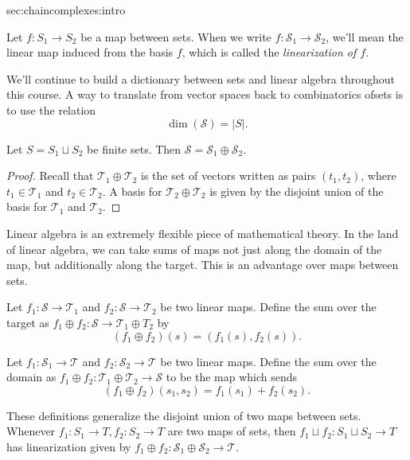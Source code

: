 \begin{stationconnection}{sec:chaincomplexes:intro}
\begin{definition}
Let $f:S_1\to S_2$ be a map between sets. When we  write  $f: \mathcal S_1\to \mathcal S_2$, we'll mean the linear map induced from the basis $f$, which is called the \emph{linearization of $f$}.
\end{definition}
We'll continue to build a dictionary between sets and linear algebra throughout this course. A way to translate from vector spaces back to combinatorics ofsets is to use the relation 
\[\dim(\mathcal S)=|S|.\]
\begin{claim}
Let $S= S_1\sqcup S_2$ be finite sets. Then $\mathcal S= \mathcal S_1\oplus \mathcal S_2. $
\end{claim}
\begin{proof}
Recall that $\mathcal T_1\oplus \mathcal T_2$ is the set of vectors written as pairs $(t_1, t_2)$, where $t_1\in \mathcal T_1$ and $t_2\in \mathcal T_2$. A basis for $\mathcal T_2\oplus \mathcal T_2$ is given by the disjoint union of the basis for $\mathcal T_1$ and $\mathcal T_2$. 
\end{proof}
Linear algebra is an extremely flexible piece of mathematical theory. In the land of linear algebra, we can take sums of maps not just along the domain of the map, but additionally along the target. This is an advantage over maps between sets.  
\begin{definition} Let $f_1: \mathcal S\to \mathcal T_1$ and $f_2: \mathcal S\to \mathcal T_2$ be two linear maps. Define the sum over the target as $f_1\oplus f_2: \mathcal S\to \mathcal T_1\oplus T_2$ by 
\[(f_1\oplus f_2)(s)=(f_1(s), f_2(s)).\]
\end{definition}
\begin{definition} Let $f_1: \mathcal S_1\to \mathcal T$ and $f_2: \mathcal S_2 \to \mathcal T$ be two linear maps. Define the sum over the domain as $f_1\oplus f_2: \mathcal T_1\oplus \mathcal T_2\to \mathcal S$ to be the map which sends 
\[ (f_1\oplus f_2)(s_1, s_2)=f_1(s_1)+f_2(s_2).\]
\end{definition}
These definitions generalize the disjoint union of two maps between sets. Whenever $f_1:S_1\to T, f_2: S_2\to T$ are two maps of sets, then $f_1\sqcup f_2: S_1\sqcup S_2\to T$ has linearization given by $f_1\oplus f_2: \mathcal S_1\oplus \mathcal S_2\to \mathcal T$. 
\begin{comment}
Suppose we have a decomposition of a set $C$ into subsets $S_1$ and $S_2$, which we might represent by the following commutative diagram. 
\[
\begin{tikzcd}
A= S_1\cap S_2\arrow{r}{i_1} \arrow{d}{i_2}& S_1 \arrow{d}{j_1}\\

\end{comment}
\end{stationconnection}
